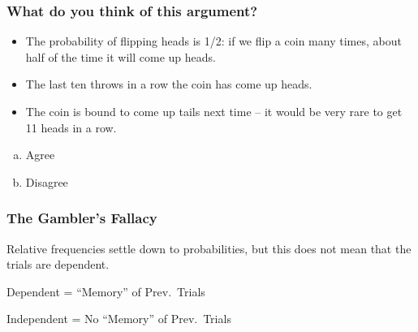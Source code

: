 \documentclass[handout]{beamer}
\begin{document}
\begin{frame}

\frametitle{What do you think of this argument?}
\begin{itemize}
	\item The probability of flipping heads is 1/2: if we flip a coin many times, about half of the time it will come up heads.
	\item The last ten throws in a row the coin has come up heads.
	\item The coin is bound to come up tails next time -- it would be very rare to get 11 heads in a row.
\end{itemize}

\begin{enumerate}[(a)]
	\item Agree
	\item Disagree
\end{enumerate}

\end{frame}
\begin{frame}

\frametitle{The Gambler's Fallacy}

\begin{alertblock}{Relative frequencies settle down to probabilities, but this does not mean that the trials are dependent.}\end{alertblock}


\begin{block}{Dependent = ``Memory'' of Prev.\ Trials}\end{block}

\begin{block}{Independent = No ``Memory'' of Prev.\ Trials}\end{block}



\end{frame}
\end{document}
